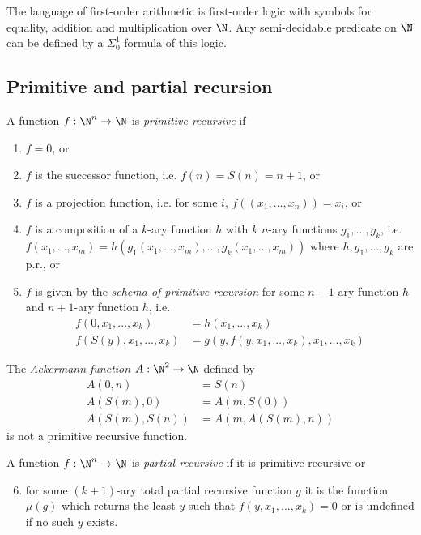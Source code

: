 \documentclass{article}
\begin{document}
\begin{theorem*}[Notes I.41]
	The language of first-order arithmetic is first-order logic with symbols for
	equality, addition and multiplication over $\N$. Any semi-decidable predicate on
	$\N$ can be defined by a $\Sigma_0^1$ formula of this logic.
\end{theorem*}

\subsection{Primitive and partial recursion}

\begin{definition*}
	A function $f:\N^n\to\N$ is \emph{primitive recursive} if
	\begin{enumerate}[label=R\arabic*.]
		\item $f=0$, or
		\item $f$ is the successor function, i.e. $f(n)=S(n)=n+1$, or
		\item $f$ is a projection function, i.e. for some $i$, $f((x_1,...,x_n))=x_i$, or
		\item $f$ is a composition of a $k$-ary function $h$ with $k$ $n$-ary functions $g_1,...,g_k$, i.e.
		      $f(x_1,...,x_m)=h(g_1(x_1,...,x_m),...,g_k(x_1,...,x_m))$ where $h,g_1,...,g_k$ are p.r., or
		\item $f$ is given by the \emph{schema of primitive recursion} for some $n-1$-ary function $h$ and
		      $n+1$-ary function $h$, i.e.
		      \begin{align*}
			      f(0,x_1,...,x_k)    & = h(x_1,...,x_k)                    \\
			      f(S(y),x_1,...,x_k) & = g(y,f(y,x_1,...,x_k),x_1,...,x_k)
		      \end{align*}
	\end{enumerate}
\end{definition*}

\begin{theorem*}[Notes I.43]
	The \emph{Ackermann function} $A:\N^2\to\N$ defined by
	\begin{align*}
		A(0,n)        & = S(n)             \\
		A(S(m), 0)    & = A(m,S(0))        \\
		A(S(m), S(n)) & = A(m, A(S(m), n))
	\end{align*}
	is not a primitive recursive function.
\end{theorem*}

\begin{definition*}
	A function $f:\N^n\to\N$ is \emph{partial recursive} if it is primitive recursive or
	\begin{enumerate}[label=R\arabic*.]
		\setcounter{enumi}{5}
		\item for some $(k+1)$-ary total partial recursive function $g$ it is the function $\mu(g)$
		      which returns the least $y$ such that $f(y,x_1,...,x_k)=0$ or is undefined if no such $y$
		      exists.
	\end{enumerate}
\end{definition*}
\end{document}
